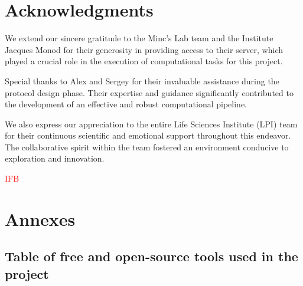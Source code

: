 \documentclass[11pt,a4paper]{article}
\begin{document}
\section*{Acknowledgments}

We extend our sincere gratitude to the Minc's Lab team and the Institute Jacques Monod for their generosity in providing access to their server, which played a crucial role in the execution of computational tasks for this project.

Special thanks to Alex and Sergey for their invaluable assistance during the protocol design phase. Their expertise and guidance significantly contributed to the development of an effective and robust computational pipeline.

We also express our appreciation to the entire Life Sciences Institute (LPI) team for their continuous scientific and emotional support throughout this endeavor. The collaborative spirit within the team fostered an environment conducive to exploration and innovation.

\textcolor{red}{IFB}

\printbibliography

\newpage

\section*{Annexes}

\subsection*{Table of free and open-source tools used in the project}
\end{document}
